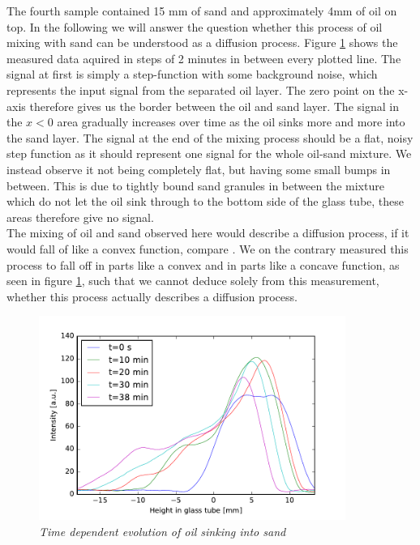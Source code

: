 The fourth sample contained 15 mm of sand and approximately 4mm of oil on top. In the following we will answer the question whether this process of oil mixing with sand can be understood as a diffusion process. Figure \ref{fig:13} shows the measured data aquired in steps of 2 minutes in between every plotted line. The signal at first is simply a step-function with some background noise, which represents the input signal from the separated oil layer. The zero point on the x-axis therefore gives us the border between the oil and sand layer. The signal in the $x<0$ area gradually increases over time as the oil sinks more and more into the sand layer. The signal at the end of the mixing process should be a flat, noisy step function as it should represent one signal for the whole oil-sand mixture. We instead observe it not being completely flat, but having some small bumps in between. This is due to tightly bound sand granules in between the mixture which do not let the oil sink through to the bottom side of the glass tube, these areas therefore give no signal.\\
The mixing of oil and sand observed here would describe a diffusion process, if it would fall of like a convex function, compare \cite{diffusion}. We on the contrary measured this process to fall off in parts like a convex and in parts like a concave function, as seen in figure \ref{fig:13}, such that we cannot deduce solely from this measurement, whether this process actually describes a diffusion process.
\begin{figure}[h]
	\centering
	\includegraphics[width=100mm]{AccumulatedOilSand}
	\caption{\itshape Time dependent evolution of oil sinking into sand}
	\label{fig:13}
\end{figure}

